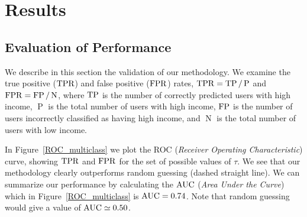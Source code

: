 \section{Results}

\subsection{Evaluation of Performance}




We describe in this section the validation of our methodology.
We examine the true positive ($\operatorname{TPR}$) and false positive ($\operatorname{FPR}$) rates, \( \operatorname{TPR} = \operatorname{TP} / \operatorname{P} \) and \( \operatorname{FPR} = \operatorname{FP} / \operatorname{N} \), where $\operatorname{TP}$ is the number of correctly predicted users with high income, $\operatorname{P}$ is the total number of users with high income, $\operatorname{FP}$ is the number of users incorrectly classified as having high income, and $\operatorname{N}$ is the total number of users with low income.

In Figure~\ref{ROC_multiclass} we plot the ROC (\textit{Receiver Operating Characteristic}) curve, showing $\operatorname{TPR}$ and $\operatorname{FPR}$ for the set of possible values of $\tau$. We see that our methodology clearly outperforms random guessing (dashed straight line). We can summarize our performance by calculating  the $\operatorname{AUC}$ (\textit{Area Under the Curve}) which in Figure~\ref{ROC_multiclass} is $\operatorname{AUC} = 0.74$. Note that random guessing would give a value of $\operatorname{AUC} \simeq 0.50$.



